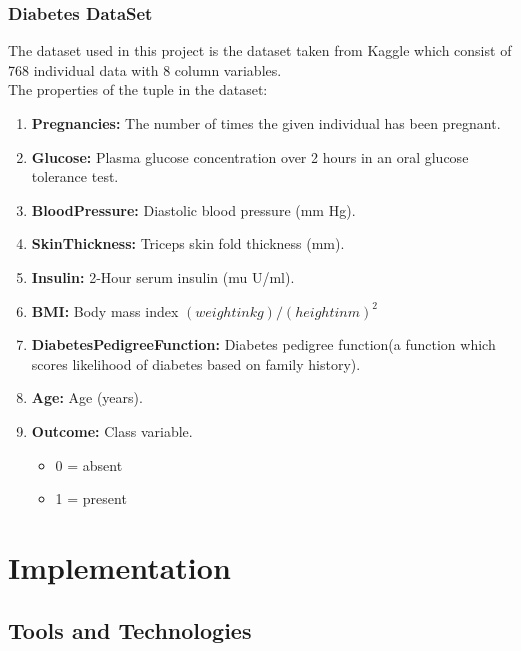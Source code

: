 \documentclass[oneside,12pt]{Classes/VTU}
\begin{document}
	\subsection{Diabetes DataSet}
	The dataset used in this project is the dataset taken from Kaggle which consist of 768 individual data with 8 column variables.\\
	The properties of the tuple in the dataset:
	\begin{enumerate}
		\item \textbf{Pregnancies:} The number of times the given individual has been pregnant.
		\item \textbf{Glucose:} Plasma glucose concentration over 2 hours in an oral glucose tolerance test.
		\item \textbf{BloodPressure:} Diastolic blood pressure (mm Hg).
		\item \textbf{SkinThickness:} Triceps skin fold thickness (mm).
		\item \textbf{Insulin:} 2-Hour serum insulin (mu U/ml).
		\item \textbf{BMI:} Body mass index $(weight in kg)/(height in m)^2$
		\item \textbf{DiabetesPedigreeFunction:} Diabetes pedigree function(a function which scores likelihood of diabetes based on family history).
		\item \textbf{Age:} Age (years).
		\item \textbf{Outcome:} Class variable.
		\begin{itemize}
			\item 0 = absent
			\item 1 = present
		\end{itemize}
		
	\end{enumerate}
	
	\chapter{Implementation}
	\section{Tools and Technologies}
\end{document}
